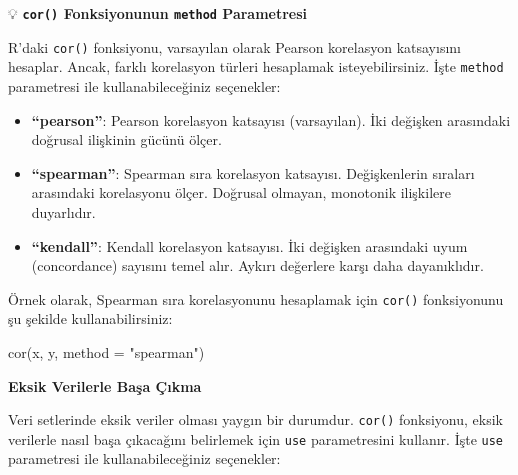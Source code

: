 \documentclass[
  letterpaper,
  DIV=11,
  numbers=noendperiod]{scrartcl}
\newenvironment{Shaded}{\begin{snugshade}}{\end{snugshade}}
\newcommand{\AttributeTok}[1]{\textcolor[rgb]{0.40,0.45,0.13}{#1}}
\newcommand{\FunctionTok}[1]{\textcolor[rgb]{0.28,0.35,0.67}{#1}}
\newcommand{\NormalTok}[1]{\textcolor[rgb]{0.00,0.23,0.31}{#1}}
\newcommand{\StringTok}[1]{\textcolor[rgb]{0.13,0.47,0.30}{#1}}
\providecommand{\tightlist}{%
  \setlength{\itemsep}{0pt}\setlength{\parskip}{0pt}}\usepackage{longtable,booktabs,array}
\begin{document}
\begin{tcolorbox}[enhanced jigsaw, bottomrule=.15mm, opacitybacktitle=0.6, rightrule=.15mm, left=2mm, toprule=.15mm, leftrule=.75mm, titlerule=0mm, colframe=quarto-callout-note-color-frame, opacityback=0, arc=.35mm, colbacktitle=quarto-callout-note-color!10!white, title=\textcolor{quarto-callout-note-color}{\faInfo}\hspace{0.5em}{Not}, coltitle=black, breakable, bottomtitle=1mm, toptitle=1mm, colback=white]

💡 \textbf{\texttt{cor()} Fonksiyonunun \texttt{method} Parametresi}

R'daki \texttt{cor()} fonksiyonu, varsayılan olarak Pearson korelasyon
katsayısını hesaplar. Ancak, farklı korelasyon türleri hesaplamak
isteyebilirsiniz. İşte \texttt{method} parametresi ile
kullanabileceğiniz seçenekler:

\begin{itemize}
\tightlist
\item
  \textbf{``pearson''}: Pearson korelasyon katsayısı (varsayılan). İki
  değişken arasındaki doğrusal ilişkinin gücünü ölçer.
\item
  \textbf{``spearman''}: Spearman sıra korelasyon katsayısı.
  Değişkenlerin sıraları arasındaki korelasyonu ölçer. Doğrusal olmayan,
  monotonik ilişkilere duyarlıdır.
\item
  \textbf{``kendall''}: Kendall korelasyon katsayısı. İki değişken
  arasındaki uyum (concordance) sayısını temel alır. Aykırı değerlere
  karşı daha dayanıklıdır.
\end{itemize}

Örnek olarak, Spearman sıra korelasyonunu hesaplamak için \texttt{cor()}
fonksiyonunu şu şekilde kullanabilirsiniz:

\begin{Shaded}
\begin{Highlighting}[]
\FunctionTok{cor}\NormalTok{(x, y, }\AttributeTok{method =} \StringTok{"spearman"}\NormalTok{)}
\end{Highlighting}
\end{Shaded}

\textbf{Eksik Verilerle Başa Çıkma}

Veri setlerinde eksik veriler olması yaygın bir durumdur. \texttt{cor()}
fonksiyonu, eksik verilerle nasıl başa çıkacağını belirlemek için
\texttt{use} parametresini kullanır. İşte \texttt{use} parametresi ile
kullanabileceğiniz seçenekler:


\end{tcolorbox}
\end{document}
